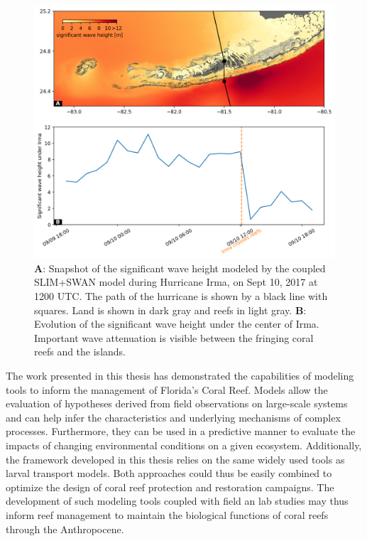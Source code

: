 \begin{figure}
    \centering
    \includegraphics[width=\textwidth]{chapters/conclusions/figures/swh_curve.png}
    \caption{\textbf{A}: Snapshot of the significant wave height modeled by the coupled SLIM+SWAN model during Hurricane Irma, on Sept 10, 2017 at 1200 UTC. The path of the hurricane is shown by a black line with squares. Land is shown in dark gray and reefs in light gray. \textbf{B}: Evolution of the significant wave height under the center of Irma. Important wave attenuation is visible between the fringing coral reefs and the islands.}
    \label{ccl:swh}
\end{figure}

The work presented in this thesis has demonstrated the capabilities of modeling tools to inform the management of Florida's Coral Reef. Models allow the evaluation of hypotheses derived from field observations on large-scale systems and can help infer the characteristics and underlying mechanisms of complex processes. Furthermore, they can be used in a predictive manner to evaluate the impacts of changing environmental conditions on a given ecosystem. Additionally, the framework developed in this thesis relies on the same widely used tools as larval transport models. Both approaches could thus be easily combined to optimize the design of coral reef protection and restoration campaigns. The development of such modeling tools coupled with field an lab studies may thus inform reef management to maintain the biological functions of coral reefs through the Anthropocene.